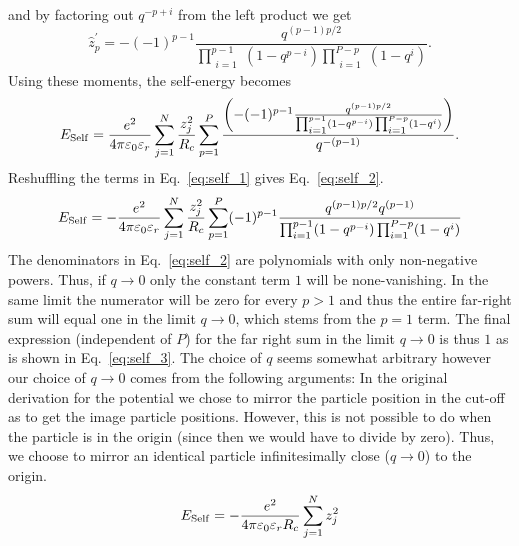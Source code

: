 \documentclass[
journal=jctcce,
manuscript=letter]{achemso}
\begin{document}
and by factoring out $q^{-p+i}$ from the left product we get
\begin{equation}
\label{eq:moment_derivation_0_self4}
\hat{z}^{\prime}_p = -(-1)^{p-1}\frac{q^{(p-1)p/2}}{\prod_{\substack{i = 1}}^{p-1}(1-q^{p-i})\prod_{\substack{i = 1 }}^{P-p}(1-q^{i})}.
\end{equation}
Using these moments, the self-energy becomes
\begin{equation}
\label{eq:self_1}
E_{{\rm Self}} = \frac{e^2}{4\pi\varepsilon_0\varepsilon_r}\sum_{j = 1}^{N} \frac{z_j^2}{R_c}\sum_{p=1}^P \frac{\left(-(-1)^{p-1}\frac{q^{(p-1)p/2}}{\prod_{\substack{i = 1}}^{p-1}(1-q^{p-i})\prod_{\substack{i = 1 }}^{P-p}(1-q^{i})} \right)}{q^{-(p-1)}}.
\end{equation}
Reshuffling the terms in Eq.~\ref{eq:self_1} gives Eq.~\ref{eq:self_2}.
\begin{equation}
\label{eq:self_2}
E_{{\rm Self}} = -\frac{e^2}{4\pi\varepsilon_0\varepsilon_r}\sum_{j = 1}^{N} \frac{z_j^2}{R_c}\sum_{p=1}^P(-1)^{p-1}\frac{q^{(p-1)p/2}q^{(p-1)}}{\prod_{\substack{i = 1}}^{p-1}(1-q^{p-i})\prod_{\substack{i = 1 }}^{P-p}(1-q^{i})}
\end{equation}
The denominators in Eq.~\ref{eq:self_2} are polynomials with only non-negative powers. Thus, if $q\to 0$ only the constant term $1$ will be none-vanishing. In the same limit the numerator will be zero for every $p>1$ and thus the entire far-right sum will equal one in the limit $q\to 0$, which stems from the $p=1$ term. The final expression (independent of $P$) for the far right sum in the limit $q\to 0$ is thus $1$ as is shown in Eq.~\ref{eq:self_3}. The choice of $q$ seems somewhat arbitrary however our choice of $q\to 0$ comes from the following arguments: In the original derivation for the potential we chose to mirror the particle position in the cut-off as to get the image particle positions. However, this is not possible to do when the particle is in the origin (since then we would have to divide by zero). Thus, we choose to mirror an identical particle infinitesimally close ($q\to 0$) to the origin.
\begin{equation}
\label{eq:self_3}
E_{{\rm Self}} = -\frac{e^2}{4\pi\varepsilon_0\varepsilon_rR_c}\sum_{j = 1}^{N} z_j^2
\end{equation}
\end{document}
